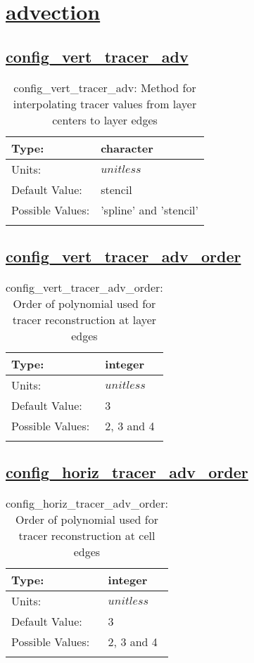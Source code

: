 \section[advection]{\hyperref[sec:nm_tab_advection]{advection}}
\label{sec:nm_sec_advection}
\subsection[config\_vert\_tracer\_adv]{\hyperref[sec:nm_tab_advection]{config\_vert\_tracer\_adv}}
\label{subsec:nm_sec_config_vert_tracer_adv}
\begin{center}
\begin{longtable}{| p{2.0in} | p{4.0in} |}
    \hline
    Type: & character \\
    \hline
    Units: & $unitless$ \\
    \hline
    Default Value: & stencil \\
    \hline
    Possible Values: & 'spline' and 'stencil' \\
    \hline
    \caption{config\_vert\_tracer\_adv: Method for interpolating tracer values from layer centers to layer edges}
\end{longtable}
\end{center}
\subsection[config\_vert\_tracer\_adv\_order]{\hyperref[sec:nm_tab_advection]{config\_vert\_tracer\_adv\_order}}
\label{subsec:nm_sec_config_vert_tracer_adv_order}
\begin{center}
\begin{longtable}{| p{2.0in} | p{4.0in} |}
    \hline
    Type: & integer \\
    \hline
    Units: & $unitless$ \\
    \hline
    Default Value: & 3 \\
    \hline
    Possible Values: & 2, 3 and 4 \\
    \hline
    \caption{config\_vert\_tracer\_adv\_order: Order of polynomial used for tracer reconstruction at layer edges}
\end{longtable}
\end{center}
\subsection[config\_horiz\_tracer\_adv\_order]{\hyperref[sec:nm_tab_advection]{config\_horiz\_tracer\_adv\_order}}
\label{subsec:nm_sec_config_horiz_tracer_adv_order}
\begin{center}
\begin{longtable}{| p{2.0in} | p{4.0in} |}
    \hline
    Type: & integer \\
    \hline
    Units: & $unitless$ \\
    \hline
    Default Value: & 3 \\
    \hline
    Possible Values: & 2, 3 and 4 \\
    \hline
    \caption{config\_horiz\_tracer\_adv\_order: Order of polynomial used for tracer reconstruction at cell edges}
\end{longtable}
\end{center}
